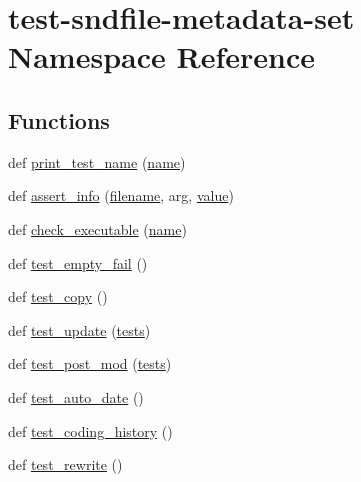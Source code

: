 \hypertarget{namespacetest-sndfile-metadata-set}{}\section{test-\/sndfile-\/metadata-\/set Namespace Reference}
\label{namespacetest-sndfile-metadata-set}
\subsection*{Functions}
\begin{DoxyCompactItemize}
\item 
def \hyperlink{namespacetest-sndfile-metadata-set_a7eadfb659f8e3c097dcb1bbc6525dd4d}{print\+\_\+test\+\_\+name} (\hyperlink{lib_2expat_8h_a1b49b495b59f9e73205b69ad1a2965b0}{name})
\item 
def \hyperlink{namespacetest-sndfile-metadata-set_abefa70f56c40e200ac92181b4803eb0d}{assert\+\_\+info} (\hyperlink{test__portburn_8cpp_a7efa5e9c7494c7d4586359300221aa5d}{filename}, arg, \hyperlink{lib_2expat_8h_a4a30a13b813682e68c5b689b45c65971}{value})
\item 
def \hyperlink{namespacetest-sndfile-metadata-set_a99fe025bd268b2d3cb998aa494a215cf}{check\+\_\+executable} (\hyperlink{lib_2expat_8h_a1b49b495b59f9e73205b69ad1a2965b0}{name})
\item 
def \hyperlink{namespacetest-sndfile-metadata-set_a3d44335479debf56f464776dad748c9f}{test\+\_\+empty\+\_\+fail} ()
\item 
def \hyperlink{namespacetest-sndfile-metadata-set_a29492aa8e7f34f4dfd7e642dda118820}{test\+\_\+copy} ()
\item 
def \hyperlink{namespacetest-sndfile-metadata-set_abfdd2d424cc78efe1fcf3c25d08eb356}{test\+\_\+update} (\hyperlink{namespacetest-sndfile-metadata-set_ab9f1387ea8f216c0c1dad3169d984274}{tests})
\item 
def \hyperlink{namespacetest-sndfile-metadata-set_a4b2a8d646bff7348935a8a90a9e190cf}{test\+\_\+post\+\_\+mod} (\hyperlink{namespacetest-sndfile-metadata-set_ab9f1387ea8f216c0c1dad3169d984274}{tests})
\item 
def \hyperlink{namespacetest-sndfile-metadata-set_adfa6dc8e4c9ea6b5b2cde5215121747e}{test\+\_\+auto\+\_\+date} ()
\item 
def \hyperlink{namespacetest-sndfile-metadata-set_a53b65e1ac10aaf8504cbf832ee982461}{test\+\_\+coding\+\_\+history} ()
\item 
def \hyperlink{namespacetest-sndfile-metadata-set_a2720cc7879f0c1b9c41d89607f4ba0d5}{test\+\_\+rewrite} ()
\end{DoxyCompactItemize}
